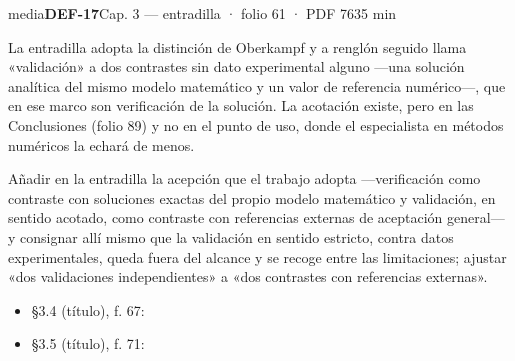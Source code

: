 \begin{ficha}{media}{\casilla\textbf{DEF-17}\quad{}\quad Cap. 3 — entradilla · folio 61 · PDF 76\hfill 35 min}
\par
{}La entradilla adopta la distinción de Oberkampf y a renglón seguido llama «validación» a dos contrastes sin dato experimental alguno —una solución analítica del mismo modelo matemático y un valor de referencia numérico—, que en ese marco son verificación de la solución. La acotación existe, pero en las Conclusiones (folio 89) y no en el punto de uso, donde el especialista en métodos numéricos la echará de menos.\par
{}Añadir en la entradilla la acepción que el trabajo adopta —verificación como contraste con soluciones exactas del propio modelo matemático y validación, en sentido acotado, como contraste con referencias externas de aceptación general— y consignar allí mismo que la validación en sentido estricto, contra datos experimentales, queda fuera del alcance y se recoge entre las limitaciones; ajustar «dos validaciones independientes» a «dos contrastes con referencias externas».\par
{}\begin{itemize}[leftmargin=1.2em,itemsep=1pt,topsep=1pt]
\item {\small §3.4 (título), f. 67: }
\item {\small §3.5 (título), f. 71: }
\end{itemize}
\end{ficha}
